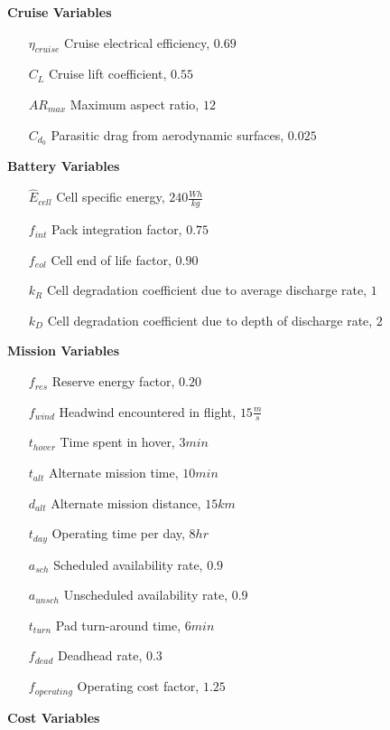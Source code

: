 \documentclass[12pt, letter]{article}
\begin{document}
\textbf{Cruise Variables}
\begin{itemize}
	\item[$\eta_{cruise}$] Cruise electrical efficiency, $0.69$
	\item[$C_L$] Cruise lift coefficient, $0.55$
	\item[$AR_{max}$] Maximum aspect ratio, $12$
	\item[$C_{d_0}$] Parasitic drag from aerodynamic surfaces, $0.025$
	\item[]
\end{itemize}
\textbf{Battery Variables}
\begin{itemize}
	\item[$\hat{E}_{cell}$] Cell specific energy, $240 \frac{Wh}{kg}$
	\item[$f_{int}$] Pack integration factor, $0.75$
	\item[$f_{eol}$] Cell end of life factor, $0.90$
	\item[$k_R$] Cell degradation coefficient due to average discharge rate, $1$
	\item[$k_D$] Cell degradation coefficient due to depth of discharge rate, $2$
	\item[]
\end{itemize}
\textbf{Mission Variables}
\begin{itemize}
	\item[$f_{res}$] Reserve energy factor, $0.20$
	\item[$f_{wind}$] Headwind encountered in flight, $15 \frac{m}{s}$
	\item[$t_{hover}$] Time spent in hover, $3 min$
	\item[$t_{alt}$] Alternate mission time, $10 min$
	\item[$d_{alt}$] Alternate mission distance, $15 km$
	\item[$t_{day}$] Operating time per day, $8 hr$
	\item[$a_{sch}$] Scheduled availability rate, $0.9$
	\item[$a_{unsch}$] Unscheduled availability rate, $0.9$
	\item[$t_{turn}$] Pad turn-around time, $6 min$
	\item[$f_{dead}$] Deadhead rate, $0.3$
	\item[$f_{operating}$] Operating cost factor, $1.25$
	\item[]
\end{itemize}
\textbf{Cost Variables}
\end{document}

